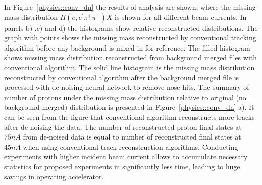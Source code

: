 In Figure~\ref{physics::conv_dn} the results of analysis are shown, where the missing mass distribution $H(e,e^\prime\pi^+\pi^-)X$ is shown for all different beam currents. In panels b) ,c) and d) the histograms show relative reconstructed distributions. The graph with points shows the missing mass reconstructed by conventional tracking algorithm before any background is mixed in for reference. The filled histogram shows missing mass distribution reconstructed from background merged files with conventional algorithm. The solid line histogram is the missing mass distribution reconstructed by conventional algorithm after the background merged file is processed with de-noising neural network to remove nose hits.
The summary of number of protons under the missing mass distribution relative to original (no background merged) distribution is presented in Figure~\ref{physics::conv_dn} a). It can be seen from the figure that conventional algorithm reconstructs more tracks after de-noising the data. The number of reconstructed proton final states at $75nA$ from de-noised data is equal to number of reconstructed final states at $45nA$ when using conventional track reconstruction algorithms.  Conducting experiments with higher incident beam current allows to accumulate necessary statistics for proposed experiments in significantly less time, leading to huge savings in operating accelerator.






